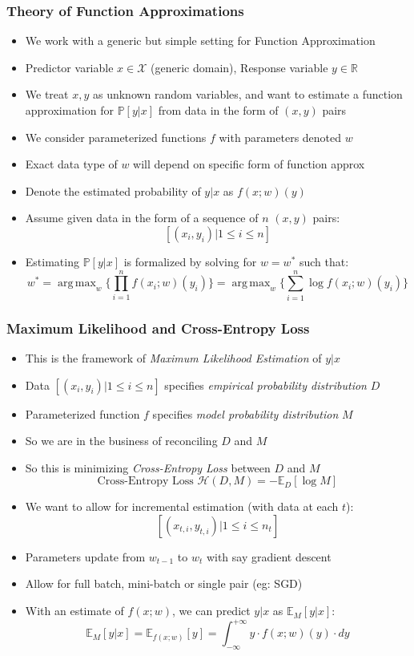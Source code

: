 \documentclass[handout]{beamer}
\DeclareMathOperator*{\argmax}{arg\,max}
\begin{document}
\begin{frame}
\frametitle{Theory of Function Approximations}
\pause
\begin{itemize}[<+->]
\item We work with a generic but simple setting for Function Approximation
\item Predictor variable $x \in \mathcal{X}$ (generic domain), Response variable $y \in \mathbb{R}$
\item We treat $x, y$ as unknown random variables, and want to estimate a function approximation for $\mathbb{P}[y|x]$ from data in the form of $(x,y)$ pairs
\item We consider parameterized functions $f$ with parameters denoted $w$
\item  Exact data type of $w$ will depend on specific form of function approx
\item  Denote the estimated probability of $y|x$ as $f(x; w)(y)$
\item  Assume given data in the form of a sequence of $n$ $(x,y)$ pairs:
$$[(x_i, y_i)|1 \leq i \leq n]$$
\item  Estimating $\mathbb{P}[y|x]$ is formalized by solving for $w=w^*$ such that:
$$w^* = \argmax_w \{ \prod_{i=1}^n f(x_i; w)(y_i)\} = \argmax_w \{ \sum_{i=1}^n \log f(x_i; w)(y_i)\}$$
\end{itemize}
\end{frame}

\begin{frame}
\frametitle{Maximum Likelihood and Cross-Entropy Loss}
\pause
\begin{itemize}[<+->]
\item This is the framework of {\em Maximum Likelihood Estimation} of $y|x$
\item Data $[(x_i, y_i)|1 \leq i \leq n]$ specifies {\em empirical probability distribution} $D$
\item Parameterized function $f$ specifies {\em model probability distribution} $M$
\item So we are in the business of reconciling $D$ and $M$
\item So this is minimizing {\em Cross-Entropy Loss} between $D$ and $M$
$$ \text{Cross-Entropy Loss } \mathcal{H}(D, M) = -\mathbb{E}_D[\log M]$$
\item We want to allow for incremental estimation (with data at each $t$):
$$[(x_{t,i}, y_{t,i})|1 \leq i \leq n_t]$$
\item Parameters update from $w_{t-1}$ to $w_t$ with say gradient descent
\item Allow for full batch, mini-batch or single pair (eg: SGD)
\item With an estimate of $f(x;w)$, we can predict $y|x$ as $\mathbb{E}_M[y|x]$:
$$\mathbb{E}_M[y|x] = \mathbb{E}_{f(x;w)}[y] = \int_{-\infty}^{+\infty} y \cdot f(x;w)(y) \cdot dy$$
\end{itemize}
\end{frame}
\end{document}
